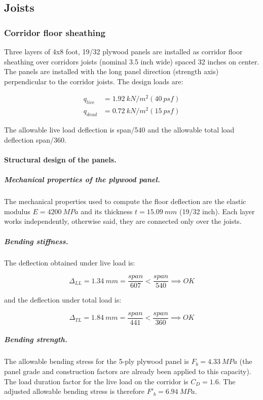 \subsection{Joists}

\subsubsection{Corridor floor sheathing}
Three layers of 4x8 foot, 19/32 plywood panels are installed as corridor floor sheathing over corridors joists (nominal 3.5 inch wide) spaced 32 inches on center. The panels are installed with the long panel direction (strength axis) perpendicular to the corridor joists. The design loads are:

\begin{align}
  q_{live}&= 1.92\ kN/m^2 (40\ psf) \\
  q_{dead}&= 0.72\ kN/m^2 (15\ psf)
\end{align}

The allowable live load deflection is span/540 and the allowable total load deflection span/360.

\paragraph{Structural design of the panels.}

\subparagraph{Mechanical properties of the plywood panel.}
The mechanical properties used to compute the floor deflection are the elastic modulus $E= 4200\ MPa$ and its thickness $t= 15.09\ mm$ (19/32 inch). Each layer works independently, otherwise said, they are connected only over the joists. 


\subparagraph{Bending stiffness.}
The deflection obtained under live load is:

\begin{equation}
  \Delta_{LL}= 1.34\ mm= \frac{span}{607} < \frac{span}{540} \implies OK
\end{equation}

\noindent and the deflection under total load is:

\begin{equation}
  \Delta_{TL}= 1.84\ mm= \frac{span}{441} < \frac{span}{360} \implies OK
\end{equation}

\subparagraph{Bending strength.}
The allowable bending stress for the 5-ply plywood panel is $F_b= 4.33\ MPa$ (the panel grade and construction factors are already been applied to this capacity). The load duration factor for the live load on the corridor is $C_D= 1.6$. The adjusted allowable bending stress is therefore $F'_b= 6.94\ MPa$.\\

